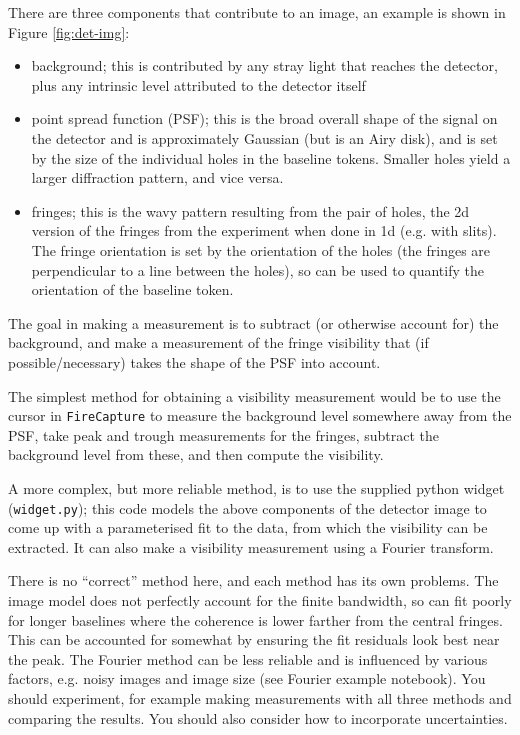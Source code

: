 \documentclass[11pt]{article}
\begin{document}
There are three components that contribute to an image, an example is shown in Figure \ref{fig:det-img}:
\begin{itemize}
    \item background; this is contributed by any stray light that reaches the detector, plus any intrinsic level attributed to the detector itself
    \item point spread function (PSF); this is the broad overall shape of the signal on the detector and is approximately Gaussian (but is an Airy disk), and is set by the size of the individual holes in the baseline tokens. Smaller holes yield a larger diffraction pattern, and vice versa.
    \item fringes; this is the wavy pattern resulting from the pair of holes, the 2d version of the fringes from the experiment when done in 1d (e.g. with slits). The fringe orientation is set by the orientation of the holes (the fringes are perpendicular to a line between the holes), so can be used to quantify the orientation of the baseline token.
\end{itemize}
The goal in making a measurement is to subtract (or otherwise account for) the background, and make a measurement of the fringe visibility that (if possible/necessary) takes the shape of the PSF into account.

The simplest method for obtaining a visibility measurement would be to use the cursor in \texttt{FireCapture} to measure the background level somewhere away from the PSF, take peak and trough measurements for the fringes, subtract the background level from these, and then compute the visibility.

A more complex, but more reliable method, is to use the supplied python widget (\texttt{widget.py}); this code models the above components of the detector image to come up with a parameterised fit to the data, from which the visibility can be extracted. It can also make a visibility measurement using a Fourier transform.

There is no ``correct'' method here, and each method has its own problems. The image model does not perfectly account for the finite bandwidth, so can fit poorly for longer baselines where the coherence is lower farther from the central fringes. This can be accounted for somewhat by ensuring the fit residuals look best near the peak. The Fourier method can be less reliable and is influenced by various factors, e.g. noisy images and image size (see Fourier example notebook). You should experiment, for example making measurements with all three methods and comparing the results. You should also consider how to incorporate uncertainties.
\end{document}
